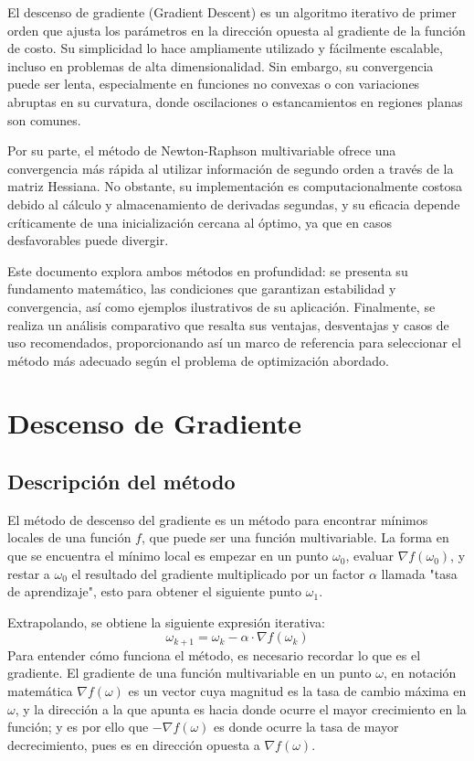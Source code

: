 \documentclass[conference]{IEEEtran}
\begin{document}
El descenso de gradiente (Gradient Descent) es un algoritmo iterativo de primer orden que ajusta los parámetros en la dirección opuesta al gradiente de la función de costo. Su simplicidad lo hace ampliamente utilizado y fácilmente escalable, incluso en problemas de alta dimensionalidad. Sin embargo, su convergencia puede ser lenta, especialmente en funciones no convexas o con variaciones abruptas en su curvatura, donde oscilaciones o estancamientos en regiones planas son comunes.

Por su parte, el método de Newton-Raphson multivariable ofrece una convergencia más rápida al utilizar información de segundo orden a través de la matriz Hessiana. No obstante, su implementación es computacionalmente costosa debido al cálculo y almacenamiento de derivadas segundas, y su eficacia depende críticamente de una inicialización cercana al óptimo, ya que en casos desfavorables puede divergir.

Este documento explora ambos métodos en profundidad: se presenta su fundamento matemático, las condiciones que garantizan estabilidad y convergencia, así como ejemplos ilustrativos de su aplicación. Finalmente, se realiza un análisis comparativo que resalta sus ventajas, desventajas y casos de uso recomendados, proporcionando así un marco de referencia para seleccionar el método más adecuado según el problema de optimización abordado.

\section{Descenso de Gradiente}\label{sec1}
\subsection{Descripción del método}\label{sec1:1}
El método de descenso del gradiente es un método para encontrar mínimos locales de una función $f$, que puede ser una función multivariable. La forma en que se encuentra el mínimo local es empezar en un punto $\omega_{0}$, evaluar $\nabla f(\omega_{0})$, y restar a $\omega_{0}$ el resultado del gradiente multiplicado por un factor $\alpha$ llamada "tasa de aprendizaje", esto para obtener el siguiente punto $\omega_{1}$. 

Extrapolando, se obtiene la siguiente expresión iterativa:
$$\omega_{k+1}=\omega _{k}-\alpha\cdot \nabla f(\omega_{k})$$
Para entender cómo funciona el método, es necesario recordar lo que es el gradiente. El gradiente de una función multivariable en un punto $\omega$, en notación matemática $\nabla f(\omega)$ es un vector cuya magnitud es la tasa de cambio máxima en $\omega$, y la dirección a la que apunta es hacia donde ocurre el mayor crecimiento en la función; y es por ello que $-\nabla f(\omega)$ es donde ocurre la tasa de mayor decrecimiento, pues es en dirección opuesta a $\nabla f(\omega)$.
\end{document}
